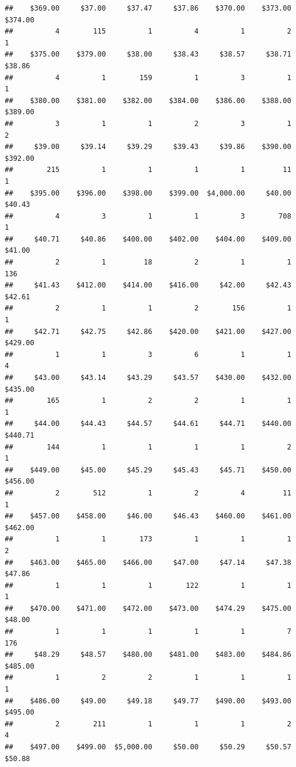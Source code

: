 \begin{verbatim}
##    $369.00     $37.00     $37.47     $37.86    $370.00    $373.00    $374.00 
##          4        115          1          4          1          2          1 
##    $375.00    $379.00     $38.00     $38.43     $38.57     $38.71     $38.86 
##          4          1        159          1          3          1          1 
##    $380.00    $381.00    $382.00    $384.00    $386.00    $388.00    $389.00 
##          3          1          1          2          3          1          2 
##     $39.00     $39.14     $39.29     $39.43     $39.86    $390.00    $392.00 
##        215          1          1          1          1         11          1 
##    $395.00    $396.00    $398.00    $399.00  $4,000.00     $40.00     $40.43 
##          4          3          1          1          3        708          1 
##     $40.71     $40.86    $400.00    $402.00    $404.00    $409.00     $41.00 
##          2          1         18          2          1          1        136 
##     $41.43    $412.00    $414.00    $416.00     $42.00     $42.43     $42.61 
##          2          1          1          2        156          1          1 
##     $42.71     $42.75     $42.86    $420.00    $421.00    $427.00    $429.00 
##          1          1          3          6          1          1          4 
##     $43.00     $43.14     $43.29     $43.57    $430.00    $432.00    $435.00 
##        165          1          2          2          1          1          1 
##     $44.00     $44.43     $44.57     $44.61     $44.71    $440.00    $440.71 
##        144          1          1          1          1          2          1 
##    $449.00     $45.00     $45.29     $45.43     $45.71    $450.00    $456.00 
##          2        512          1          2          4         11          1 
##    $457.00    $458.00     $46.00     $46.43    $460.00    $461.00    $462.00 
##          1          1        173          1          1          1          2 
##    $463.00    $465.00    $466.00     $47.00     $47.14     $47.38     $47.86 
##          1          1          1        122          1          1          1 
##    $470.00    $471.00    $472.00    $473.00    $474.29    $475.00     $48.00 
##          1          1          1          1          1          7        176 
##     $48.29     $48.57    $480.00    $481.00    $483.00    $484.86    $485.00 
##          1          2          2          1          1          1          1 
##    $486.00     $49.00     $49.18     $49.77    $490.00    $493.00    $495.00 
##          2        211          1          1          1          2          4 
##    $497.00    $499.00  $5,000.00     $50.00     $50.29     $50.57     $50.88 

\end{verbatim}
